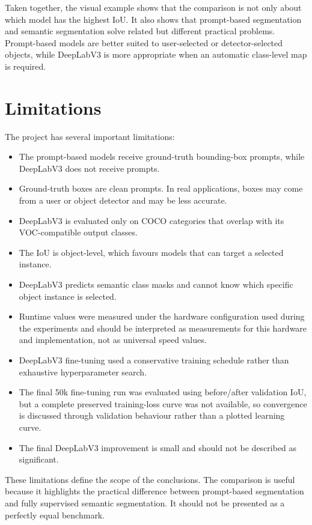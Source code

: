 \documentclass[9pt,a4paper,oneside]{rho-class/rho}
\begin{document}
    Taken together, the visual example shows that the comparison is not only about which model has the highest IoU. It also shows that prompt-based segmentation and semantic segmentation solve related but different practical problems. Prompt-based models are better suited to user-selected or detector-selected objects, while DeepLabV3 is more appropriate when an automatic class-level map is required.

\section{Limitations}

    The project has several important limitations:

    \begin{itemize}
        \item The prompt-based models receive ground-truth bounding-box prompts, while DeepLabV3 does not receive prompts.
        \item Ground-truth boxes are clean prompts. In real applications, boxes may come from a user or object detector and may be less accurate.
        \item DeepLabV3 is evaluated only on COCO categories that overlap with its VOC-compatible output classes.
        \item The IoU is object-level, which favours models that can target a selected instance.
        \item DeepLabV3 predicts semantic class masks and cannot know which specific object instance is selected.
        \item Runtime values were measured under the hardware configuration used during the experiments and should be interpreted as measurements for this hardware and implementation, not as universal speed values.
        \item DeepLabV3 fine-tuning used a conservative training schedule rather than exhaustive hyperparameter search.
        \item The final 50k fine-tuning run was evaluated using before/after validation IoU, but a complete preserved training-loss curve was not available, so convergence is discussed through validation behaviour rather than a plotted learning curve.
        \item The final DeepLabV3 improvement is small and should not be described as significant.
    \end{itemize}

    These limitations define the scope of the conclusions. The comparison is useful because it highlights the practical difference between prompt-based segmentation and fully supervised semantic segmentation. It should not be presented as a perfectly equal benchmark.
\end{document}
